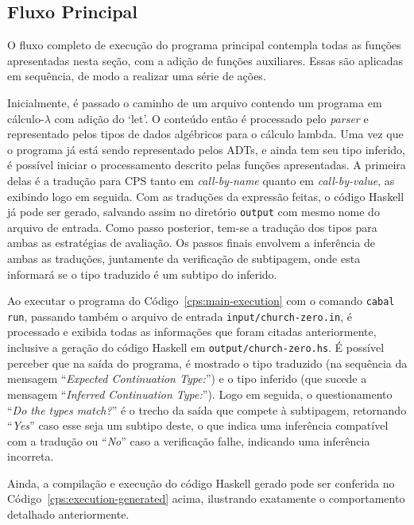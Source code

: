 \subsection{Fluxo Principal}\label{subsec:cps-main-program}
O fluxo completo de execução do programa principal contempla todas as funções apresentadas nesta seção, com a adição de funções auxiliares.
Essas são aplicadas em sequência, de modo a realizar uma série de ações.

Inicialmente, é passado o caminho de um arquivo contendo um programa em cálculo-$\lambda$ com adição do `let'.
O conteúdo então é processado pelo \textit{parser} e representado pelos tipos de dados algébricos para o cálculo lambda.
Uma vez que o programa já está sendo representado pelos ADTs, e ainda tem seu tipo inferido, é possível iniciar o processamento descrito pelas funções apresentadas.
A primeira delas é a tradução para CPS tanto em \textit{call-by-name} quanto em \textit{call-by-value}, as exibindo logo em seguida.
Com as traduções da expressão feitas, o código Haskell já pode ser gerado, salvando assim no diretório \texttt{output} com mesmo nome do arquivo de entrada.
Como passo posterior, tem-se a tradução dos tipos para ambas as estratégias de avaliação.
Os passos finais envolvem a inferência de ambas as traduções, juntamente da verificação de subtipagem, onde esta informará se o tipo traduzido é um subtipo do inferido.

\lstset{extendedchars=false, escapeinside=''}

Ao executar o programa do Código~\ref{cps:main-execution} com o comando \texttt{cabal run}, passando também o arquivo de entrada \texttt{input/church-zero.in}, é processado e exibida todas as informações que foram citadas anteriormente, inclusive a geração do código Haskell em \texttt{output/church-zero.hs}.
É possível perceber que na saída do programa, é mostrado o tipo traduzido (na sequência da mensagem ``\textit{Expected Continuation Type:}'') e o tipo inferido (que sucede a mensagem ``\textit{Inferred Continuation Type:}'').
Logo em seguida, o questionamento ``\textit{Do the types match?}'' é o trecho da saída que compete à subtipagem, retornando ``\textit{Yes}'' caso esse seja um subtipo deste, o que indica uma inferência compatível com a tradução ou ``\textit{No}'' caso a verificação falhe, indicando uma inferência incorreta.

\lstset{extendedchars=false, escapeinside=''}

Ainda, a compilação e execução do código Haskell gerado pode ser conferida no Código~\ref{cps:execution-generated} acima, ilustrando exatamente o comportamento detalhado anteriormente.
